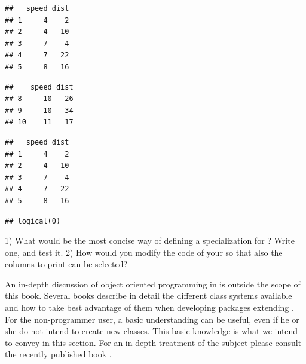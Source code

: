 \documentclass[krantz2]{krantz}\usepackage{knitr}%
\begin{document}
\begin{knitrout}\footnotesize
{}\color{fgcolor}\begin{kframe}
\begin{alltt}
\end{alltt}
\begin{verbatim}
##   speed dist
## 1     4    2
## 2     4   10
## 3     7    4
## 4     7   22
## 5     8   16
\end{verbatim}
\begin{alltt}
 \hlopt{:}\hlstd{)}
\end{alltt}
\begin{verbatim}
##    speed dist
## 8     10   26
## 9     10   34
## 10    11   17
\end{verbatim}
\begin{alltt}
 \hlkwb{<-} 
\end{alltt}
\begin{verbatim}
##   speed dist
## 1     4    2
## 2     4   10
## 3     7    4
## 4     7   22
## 5     8   16
\end{verbatim}
\begin{alltt}
 \hlopt{==}  
\end{alltt}
\begin{verbatim}
## logical(0)
\end{verbatim}
\end{kframe}
\end{knitrout}

\begin{playground}
1) What would be the most concise way of defining a  specialization for ? Write one, and test it.
2) How would you modify the code of your  so that also the columns to print can be selected?
\end{playground}

An in-depth discussion of object oriented programming in \Rlang is outside the scope of this book. Several books describe in detail the different class systems available and how to take best advantage of them when developing packages extending \Rlang. For the non-programmer user, a basic understanding can be useful, even if he or she do not intend to create new classes. This basic knowledge is what we intend to convey in this section. For an in-depth treatment of the subject please consult the recently published book  \autocite{Wickham2014}.
\end{document}
